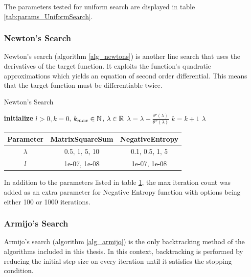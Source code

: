 \documentclass[a4paper,english,titlepage,12pt]{article}
\newcommand{\abs}[1]{\ensuremath|#1|}
\newcommand{\R}{\ensuremath\mathbb{R}}
\newcommand{\N}{\ensuremath\mathbb{N}}
\begin{document}
The parameters tested for uniform search are displayed in table \ref{tab:params_UniformSearch}.


\subsubsection{Newton's Search}
\label{sect:newtonssearch}


Newton's search (algorithm \ref{alg_newtons}) is another line search that uses the derivatives of the target function. It exploits the function's quadratic approximations which yields an equation of second order differential. This means that the target function must be differentiable twice. \cite{book:nonlinear_programming}

\begin{algorithm}[H]
\caption{Newton's Search}
\label{alg_newtons_search}
\begin{algorithmic}[1]
\STATE \textbf{initialize} $l > 0, k = 0$, $k_{max} \in \N$, $\lambda \in \R$
\WHILE{$\abs{\theta'(\lambda)} > l$ \AND $k < k_{max}$}
    \STATE $\lambda = \lambda -\frac{\theta'(\lambda)}{\theta''(\lambda)}$
    \STATE $k = k + 1$
\ENDWHILE
\RETURN $\lambda$
\end{algorithmic}
\end{algorithm}

\begin{table}[H]
\label{tab:params_NewtonsSearch}
\centering
{}
\begin{tabular}{|c|c|c|}
\hline
\rowcolor{gray!25}
Parameter & MatrixSquareSum & NegativeEntropy \\
\hline
$\lambda$ & 0.5, 1, 5, 10 & 0.1, 0.5, 1, 5 \\
$l$ & 1e-07, 1e-08 & 1e-07, 1e-08 \\
\hline
\end{tabular}
\end{table}

In addition to the parameters listed in table \ref{tab:params_NewtonsSearch}, the max iteration count was added as an extra parameter for Negative Entropy function with options being either 100 or 1000 iterations.


\subsubsection{Armijo's Search}

Armijo's search (algorithm \ref{alg_armijo}) is the only backtracking method of the algorithms included in this thesis. In this context, backtracking is performed by reducing the initial step size on every iteration until it satisfies the stopping condition. \cite{book:convex_optimization}
\end{document}
